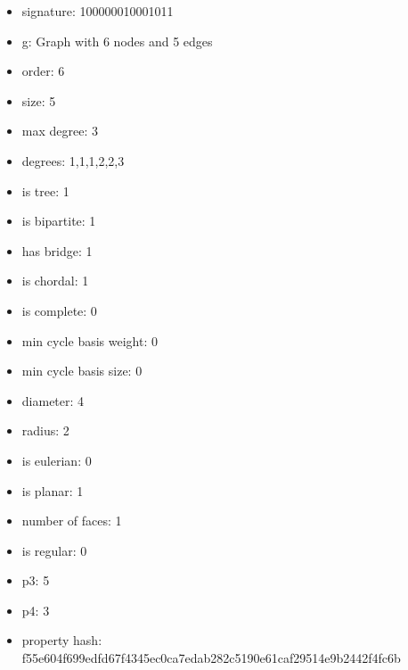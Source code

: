 \begin{itemize}
\item signature: 100000010001011
\item g: Graph with 6 nodes and 5 edges
\item order: 6
\item size: 5
\item max degree: 3
\item degrees: 1,1,1,2,2,3
\item is tree: 1
\item is bipartite: 1
\item has bridge: 1
\item is chordal: 1
\item is complete: 0
\item min cycle basis weight: 0
\item min cycle basis size: 0
\item diameter: 4
\item radius: 2
\item is eulerian: 0
\item is planar: 1
\item number of faces: 1
\item is regular: 0
\item p3: 5
\item p4: 3
\item property hash: f55e604f699edfd67f4345ec0ca7edab282c5190e61caf29514e9b2442f4fc6b
\end{itemize}
\newpage
\begin{figure}
\end{figure}
